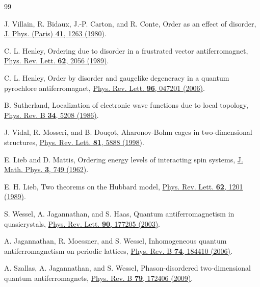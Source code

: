 \documentclass[prb,twocolumn,amsmath,amssymb,floatfix]{revtex4-2}
\begin{document}
\FloatBarrier
\begin{thebibliography}{99}

 J. Villain, R. Bidaux, J.-P. Carton, and R. Conte, Order as an effect of disorder, \href{https://doi.org/10.1051/jphys:0198000410110126300}{J. Phys. (Paris) \textbf{41}, 1263 (1980)}.

 C. L. Henley, Ordering due to disorder in a frustrated vector antiferromagnet, \href{https://doi.org/10.1103/PhysRevLett.62.2056}{Phys. Rev. Lett. \textbf{62}, 2056 (1989)}.

 C. L. Henley, Order by disorder and gaugelike degeneracy in a quantum pyrochlore antiferromagnet, \href{https://doi.org/10.1103/PhysRevLett.96.047201}{Phys. Rev. Lett. \textbf{96}, 047201 (2006)}.

 B. Sutherland, Localization of electronic wave functions due to local topology, \href{https://doi.org/10.1103/PhysRevB.34.5208}{Phys. Rev. B \textbf{34}, 5208 (1986)}.

 J. Vidal, R. Mosseri, and B. Dou\c{c}ot, Aharonov-Bohm cages in two-dimensional structures, \href{https://doi.org/10.1103/PhysRevLett.81.5888}{Phys. Rev. Lett. \textbf{81}, 5888 (1998)}.

 E. Lieb and D. Mattis, Ordering energy levels of interacting spin systems, \href{https://doi.org/10.1063/1.1724276}{J. Math. Phys. \textbf{3}, 749 (1962)}.

 E. H. Lieb, Two theorems on the Hubbard model, \href{https://doi.org/10.1103/PhysRevLett.62.1201}{Phys. Rev. Lett. \textbf{62}, 1201 (1989)}.

 S. Wessel, A. Jagannathan, and S. Haas, Quantum antiferromagnetism in quasicrystals, \href{https://doi.org/10.1103/PhysRevLett.90.177205}{Phys. Rev. Lett. \textbf{90}, 177205 (2003)}.

 A. Jagannathan, R. Moessner, and S. Wessel, Inhomogeneous quantum antiferromagnetism on periodic lattices, \href{https://doi.org/10.1103/PhysRevB.74.184410}{Phys. Rev. B \textbf{74}, 184410 (2006)}.

 A. Szallas, A. Jagannathan, and S. Wessel, Phason-disordered two-dimensional quantum antiferromagnets, \href{https://doi.org/10.1103/PhysRevB.79.172406}{Phys. Rev. B \textbf{79}, 172406 (2009)}.


\end{thebibliography}
\end{document}
